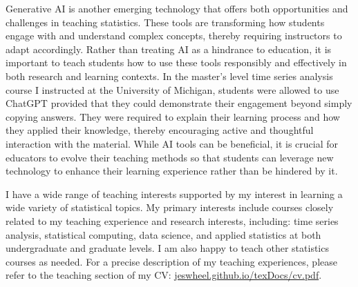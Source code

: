 \documentclass{article}
\begin{document}
Generative AI is another emerging technology that offers both opportunities and challenges in teaching statistics.
These tools are transforming how students engage with and understand complex concepts, thereby requiring instructors to adapt accordingly.
Rather than treating AI as a hindrance to education, it is important to teach students how to use these tools responsibly and effectively in both research and learning contexts.
In the master's level time series analysis course I instructed at the University of Michigan, students were allowed to use ChatGPT provided that they could demonstrate their engagement beyond simply copying answers.
They were required to explain their learning process and how they applied their knowledge, thereby encouraging active and thoughtful interaction with the material.
While AI tools can be beneficial, it is crucial for educators to evolve their teaching methods so that students can leverage new technology to enhance their learning experience rather than be hindered by it.

I have a wide range of teaching interests supported by my interest in learning a wide variety of statistical topics.
My primary interests include courses closely related to my teaching experience and research interests, including: time series analysis, statistical computing, data science, and applied statistics at both undergraduate and graduate levels.
I am also happy to teach other statistics courses as needed.
For a precise description of my teaching experiences, please refer to the teaching section of my CV: \href{https://jeswheel.github.io/texDocs/cv.pdf}{jeswheel.github.io/texDocs/cv.pdf}.



\end{document}
